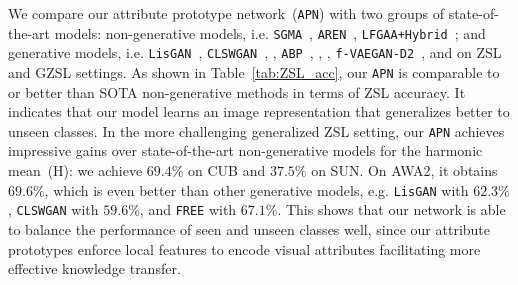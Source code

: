  We compare our attribute prototype network~(\texttt{APN}) with two groups of state-of-the-art models: non-generative models, i.e. \texttt{SGMA}~\citep{SGMA}, \texttt{AREN}~\citep{AREN}, \texttt{LFGAA+Hybrid}~\citep{liu2019attribute}; and generative models, i.e. \texttt{LisGAN}~\citep{li2019leveraging}, \texttt{CLSWGAN}~\citep{CLSWGAN}, , \texttt{ABP}~\citep{ABP}, , , \texttt{f-VAEGAN-D2}~\citep{xian2019}, and  on ZSL and GZSL settings. 
As shown in Table~\ref{tab:ZSL_acc}, our \texttt{APN} is 
comparable to or better than SOTA non-generative methods in terms of ZSL accuracy. It indicates that our model learns an image representation that generalizes better to unseen classes.
In the more challenging generalized ZSL setting, our \texttt{APN} achieves impressive gains over state-of-the-art non-generative models for the harmonic mean~(H): we achieve $69.4\%$  on CUB and $37.5\%$ on SUN. On AWA2, it obtains $69.6\%$, which is even better than other generative models, e.g. \texttt{LisGAN} with $62.3\%$, \texttt{CLSWGAN} with $59.6\%$, and \texttt{FREE} with $67.1\%$.
This shows that our network is able to balance the performance of seen and unseen classes well, since our attribute prototypes enforce local features to encode visual attributes facilitating more effective knowledge transfer. 


